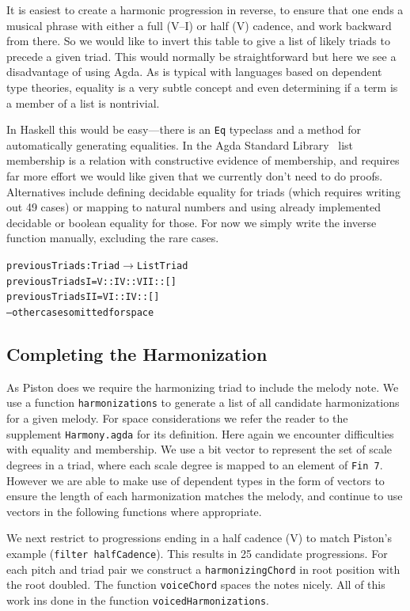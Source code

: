 It is easiest to create a harmonic progression in reverse, to
ensure that one ends a musical phrase with either a full (V--I) or half (V)
cadence, and work backward from there. So we would like to invert this
table to give a list of likely triads to precede a given triad. This
would normally be straightforward but here we see a disadvantage of
using Agda. As is typical with languages based on dependent type
theories, equality is a very subtle concept and even determining if a
term is a member of a list is nontrivial.

In Haskell this would be easy---there is an \texttt{Eq} typeclass and a
method for automatically generating equalities. In the Agda Standard
Library~\citep{agda-stdlib} list membership is a relation with
constructive evidence of membership, and requires far more effort we
would like given that we currently don't need to do
proofs. Alternatives include defining decidable equality for triads
(which requires writing out 49 cases) or mapping to natural numbers
and using already implemented decidable or boolean equality for
those. For now we simply write the inverse function manually,
excluding the rare cases.

\begin{alltt}
previousTriads : Triad \(\rightarrow\) List Triad
previousTriads I   = V :: IV :: VII :: []
previousTriads II  = VI :: IV :: []
-- other cases omitted for space
\end{alltt}

\subsection{Completing the Harmonization}
\label{sec:harmony:complete}

As Piston does we require the harmonizing triad to include the melody
note. We use a function \texttt{harmonizations} to generate a list of
all candidate harmonizations for a given melody. For space
considerations we refer the reader to the supplement
\texttt{Harmony.agda} for its definition. Here again we encounter difficulties
with equality and membership. We use a bit vector to represent the
set of scale degrees in a triad, where each scale degree is mapped to
an element of \texttt{Fin 7}. However we are able to make use of
dependent types in the form of vectors to ensure the length of each
harmonization matches the melody, and continue to use vectors in the
following functions where appropriate.

We next restrict to progressions ending in a half cadence (V) to match
Piston's example (\texttt{filter halfCadence}). This results in 25
candidate progressions. For each pitch and triad pair we construct a
\texttt{harmonizingChord} in root position with the root doubled. The
function \texttt{voiceChord} spaces the notes nicely. All of this work
ins done in the function \texttt{voicedHarmonizations}.

